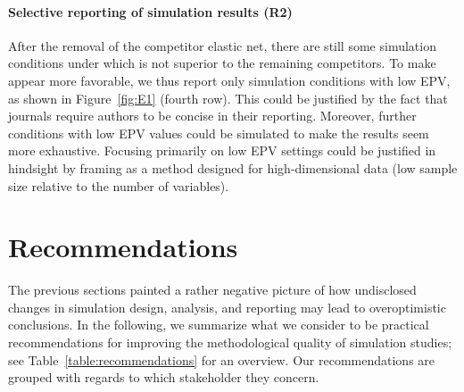 \documentclass[a4paper, 11pt]{article}
\begin{document}
\paragraph{Selective reporting of simulation results (R2)}
After the removal of the competitor elastic net, there are still
some simulation conditions under which \ainet{} is not superior to
the remaining competitors. To make \ainet{} appear more favorable, we 
thus report only simulation conditions with low EPV, as shown in 
Figure~\ref{fig:E1} (fourth row). 
This could be justified by the fact that journals require 
authors to be concise in their reporting. 
Moreover, further conditions with low EPV values could be simulated to 
make the results seem more exhaustive.
Focusing primarily on low EPV settings could be justified in 
hindsight by framing \ainet{} as a method designed for high-dimensional 
data (low sample size relative to the number of variables).

\section{Recommendations}
\label{sec:recommendations}

The previous sections painted a rather negative picture of how 
undisclosed changes in simulation design, analysis, and reporting
may lead to overoptimistic conclusions. In the
following, we summarize what we consider to be practical recommendations for
improving the methodological quality of simulation studies; see
Table~\ref{table:recommendations} for an overview. Our recommendations are
grouped with regards to which stakeholder they concern.
\end{document}

